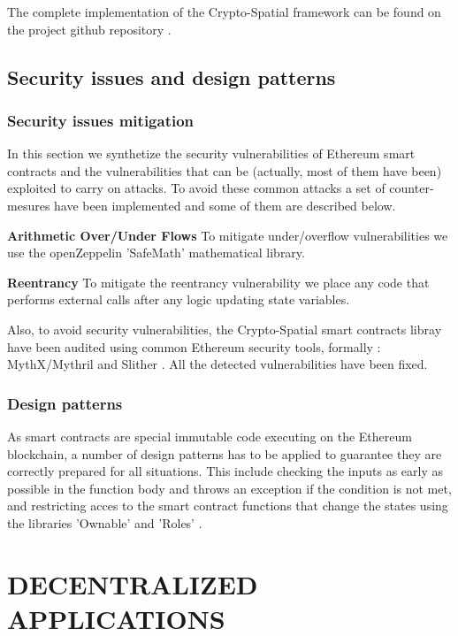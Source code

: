 \documentclass{isprs} %
\begin{document}
The complete implementation of the Crypto-Spatial framework can be found on the project github repository \cite{github_allilou_dela}.\\

\subsection{Security issues and design patterns}\label{sec:Security issues and design patterns}

\subsubsection{Security issues mitigation}\label{sec:Security issues mitigation}

In this section we synthetize the security vulnerabilities of Ethereum smart contracts and the vulnerabilities that can be (actually, most of them have been) exploited to carry on attacks. To avoid these common attacks a set of counter-mesures have been implemented and some of them are described below.

\textbf{Arithmetic Over/Under Flows}  To mitigate under/overflow vulnerabilities we use the openZeppelin 'SafeMath' mathematical library. 

\textbf{Reentrancy} To mitigate the reentrancy vulnerability we place any code that performs external calls after any logic updating state variables. 

Also, to avoid security vulnerabilities, the Crypto-Spatial smart contracts libray have been audited using common Ethereum security tools, formally : MythX/Mythril \cite{mythx} and Slither \cite{slihter}. All the detected vulnerabilities have been fixed.

\subsubsection{Design patterns}\label{sec:Design patterns}

As smart contracts are special immutable code executing on the Ethereum blockchain, a number of design patterns has to be applied to guarantee they are correctly prepared for all situations. This include checking the inputs as early as possible in the function body and throws an exception if the condition is not met, and restricting acces to the smart contract functions that change the states using the \cite{openzeppelin} libraries 'Ownable' and 'Roles' .

\newpage
\section{DECENTRALIZED APPLICATIONS}\label{sec:DECENTRALIZED APPLICATIONS}
\end{document}
